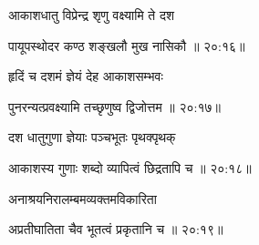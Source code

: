 
{\devanagarifont आकाशधातु विप्रेन्द्र शृणु वक्ष्यामि ते दश \thinspace{\dandab} \dontdisplaylinenum }%


{\devanagarifont पायूपस्थोदर कण्ठ शङ्खलौ मुख नासिकौ {॥ २०:१६॥} \veg\dontdisplaylinenum }%

{\devanagarifont हृदिं च दशमं ज्ञेयं देह आकाशसम्भवः \thinspace{\dandab} \dontdisplaylinenum }%


{\devanagarifont पुनरन्यत्प्रवक्ष्यामि तच्छृणुष्व द्विजोत्तम {॥ २०:१७॥} \veg\dontdisplaylinenum }%

{\devanagarifont दश धातुगुणा ज्ञेयाः पञ्चभूतः पृथक्पृथक् \thinspace{\dandab} \dontdisplaylinenum }%


{\devanagarifont आकाशस्य गुणाः शब्दो व्यापित्वं छिद्रतापि च {॥ २०:१८॥} \veg\dontdisplaylinenum }%

{\devanagarifont अनाश्रयनिरालम्बमव्यक्तमविकारिता \thinspace{\dandab} \dontdisplaylinenum }%
 

{\devanagarifont अप्रतीघातिता चैव भूतत्वं प्रकृतानि च {॥ २०:१९॥} \veg\dontdisplaylinenum }%


